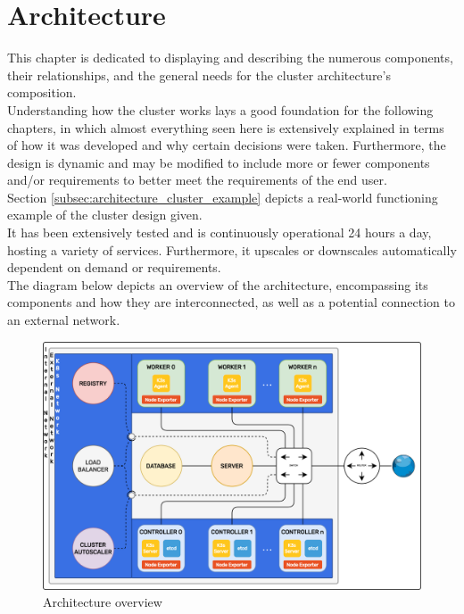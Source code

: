 \chapter{Architecture}
\label{cha:architecture}

This chapter is dedicated to displaying and describing the numerous components,
their relationships, and the general needs for the cluster architecture's composition.
\\ %
Understanding how the cluster works lays a good foundation for the following chapters,
in which almost everything seen here is extensively explained in terms of how it
was developed and why certain decisions were taken. Furthermore, the design is
dynamic and may be modified to include more or fewer components and/or
requirements to better meet the requirements of the end user. \\ %
Section \ref{subsec:architecture_cluster_example} depicts a real-world
functioning example of the cluster design given. \\ %
It has been extensively tested and is continuously operational 24 hours a day, hosting
a variety of services. Furthermore, it upscales or downscales automatically dependent
on demand or requirements. \\ %
The diagram below depicts an overview of the architecture, encompassing its
components and how they are interconnected, as well as a potential connection to
an external network.

\begin{figure}[htbp]
  \centering
  \includegraphics[width=\textwidth]{images/recluster/architecture.png}
  \caption{Architecture overview}
\end{figure}

